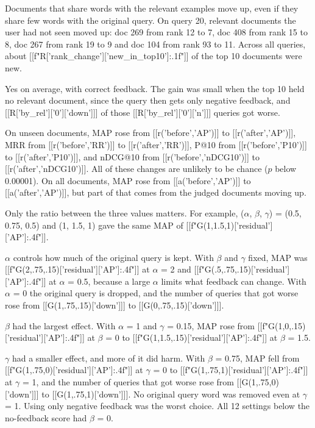 Documents that share words with the relevant examples move up, even if they share few words with the original query. On query 20, relevant documents the user had not seen moved up: doc 269 from rank 12 to 7, doc 408 from rank 15 to 8, doc 267 from rank 19 to 9 and doc 104 from rank 93 to 11. Across all queries, about [[f"{R['rank_change']['new_in_top10']:.1f}"]] of the top 10 documents were new.

Yes on average, with correct feedback. The gain was small when the top 10 held no relevant document, since the query then gets only negative feedback, and [[R['by_rel']['0']['down']]] of those [[R['by_rel']['0']['n']]] queries got worse.

On unseen documents, MAP rose from [[r('before','AP')]] to [[r('after','AP')]], MRR from [[r('before','RR')]] to [[r('after','RR')]], P@10 from [[r('before','P10')]] to [[r('after','P10')]], and nDCG@10 from [[r('before','nDCG10')]] to [[r('after','nDCG10')]]. All of these changes are unlikely to be chance ($p$ below 0.00001). On all documents, MAP rose from [[a('before','AP')]] to [[a('after','AP')]], but part of that comes from the judged documents moving up.

Only the ratio between the three values matters. For example, ($\alpha$, $\beta$, $\gamma$) = (0.5, 0.75, 0.5) and (1, 1.5, 1) gave the same MAP of [[f"{G(1,1.5,1)['residual']['AP']:.4f}"]].

$\alpha$ controls how much of the original query is kept. With $\beta$ and $\gamma$ fixed, MAP was [[f"{G(2,.75,.15)['residual']['AP']:.4f}"]] at $\alpha$ = 2 and [[f"{G(.5,.75,.15)['residual']['AP']:.4f}"]] at $\alpha$ = 0.5, because a large $\alpha$ limits what feedback can change. With $\alpha$ = 0 the original query is dropped, and the number of queries that got worse rose from [[G(1,.75,.15)['down']]] to [[G(0,.75,.15)['down']]].

$\beta$ had the largest effect. With $\alpha$ = 1 and $\gamma$ = 0.15, MAP rose from [[f"{G(1,0,.15)['residual']['AP']:.4f}"]] at $\beta$ = 0 to [[f"{G(1,1.5,.15)['residual']['AP']:.4f}"]] at $\beta$ = 1.5.

$\gamma$ had a smaller effect, and more of it did harm. With $\beta$ = 0.75, MAP fell from [[f"{G(1,.75,0)['residual']['AP']:.4f}"]] at $\gamma$ = 0 to [[f"{G(1,.75,1)['residual']['AP']:.4f}"]] at $\gamma$ = 1, and the number of queries that got worse rose from [[G(1,.75,0)['down']]] to [[G(1,.75,1)['down']]]. No original query word was removed even at $\gamma$ = 1. Using only negative feedback was the worst choice. All 12 settings below the no-feedback score had $\beta$ = 0.


